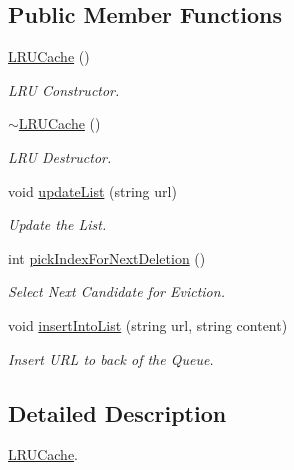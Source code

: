 \subsection*{\-Public \-Member \-Functions}
\begin{DoxyCompactItemize}
\item 
\hypertarget{classLRUCache_a6f624ad11516bc5c8b56ab19250902bb}{\hyperlink{classLRUCache_a6f624ad11516bc5c8b56ab19250902bb}{\-L\-R\-U\-Cache} ()}\label{classLRUCache_a6f624ad11516bc5c8b56ab19250902bb}

\begin{DoxyCompactList}\small\item\em \-L\-R\-U \-Constructor. \end{DoxyCompactList}\item 
\hypertarget{classLRUCache_ac841ed5b67e603f2878c26ea7555385f}{\hyperlink{classLRUCache_ac841ed5b67e603f2878c26ea7555385f}{$\sim$\-L\-R\-U\-Cache} ()}\label{classLRUCache_ac841ed5b67e603f2878c26ea7555385f}

\begin{DoxyCompactList}\small\item\em \-L\-R\-U \-Destructor. \end{DoxyCompactList}\item 
void \hyperlink{classLRUCache_a9ade7fe6ec5353a5b4259ad48929122b}{update\-List} (string url)
\begin{DoxyCompactList}\small\item\em \-Update the \-List. \end{DoxyCompactList}\item 
int \hyperlink{classLRUCache_ab5e4e2db90274ce42e32f0ea466db0ef}{pick\-Index\-For\-Next\-Deletion} ()
\begin{DoxyCompactList}\small\item\em \-Select \-Next \-Candidate for \-Eviction. \end{DoxyCompactList}\item 
void \hyperlink{classLRUCache_aa767d58be45c61f2e9a1073343465e16}{insert\-Into\-List} (string url, string content)
\begin{DoxyCompactList}\small\item\em \-Insert \-U\-R\-L to back of the \-Queue. \end{DoxyCompactList}\end{DoxyCompactItemize}


\subsection{\-Detailed \-Description}
\hyperlink{classLRUCache}{\-L\-R\-U\-Cache}. 

